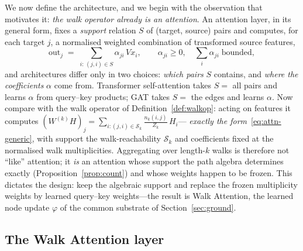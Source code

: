 \documentclass[runningheads]{llncs}
\begin{document}
We now define the architecture, and we begin with the observation that
motivates it: \emph{the walk operator already is an attention}. An attention
layer, in its general form, fixes a \emph{support} relation $S$ of (target,
source) pairs and computes, for each target $j$, a normalised weighted
combination of transformed source features,
\begin{equation}\label{eq:attn-generic}
  \mathrm{out}_j \;=\; \sum_{i:\,(j,i)\in S}\alpha_{ji}\,Vx_i,
  \qquad \alpha_{ji}\ge0,\quad \textstyle\sum_{i}\alpha_{ji}\;\text{bounded},
\end{equation}
and architectures differ only in two choices: \emph{which pairs} $S$ contains,
and \emph{where the coefficients} $\alpha$ come from. Transformer
self-attention \cite{vaswani2017attention} takes $S=$ all pairs and learns
$\alpha$ from query--key products; GAT \cite{velickovic2017graph} takes $S=$
the edges and learns $\alpha$. Now compare with the walk operator of
Definition~\ref{def:walkop}: acting on features it computes
$(W^{(k)}H)_j=\sum_{i:(j,i)\in\mathcal{S}_k}\tfrac{n_k(i,j)}{Z_k}\,H_i$---
\emph{exactly the form}~\eqref{eq:attn-generic}, with support the
walk-reachability $\mathcal{S}_k$ and coefficients fixed at the normalised walk
multiplicities. Aggregating over length-$k$ walks is therefore not ``like''
attention; it \emph{is} an attention whose support the path algebra determines
exactly (Proposition~\ref{prop:count}) and whose weights happen to be frozen.
This dictates the design: keep the algebraic support and replace the frozen
multiplicity weights by learned query--key weights---the result is Walk
Attention, the learned node update $\varphi$ of the common substrate of
Section~\ref{sec:ground}.

\subsection{The Walk Attention layer}\label{sec:layer}
\end{document}
